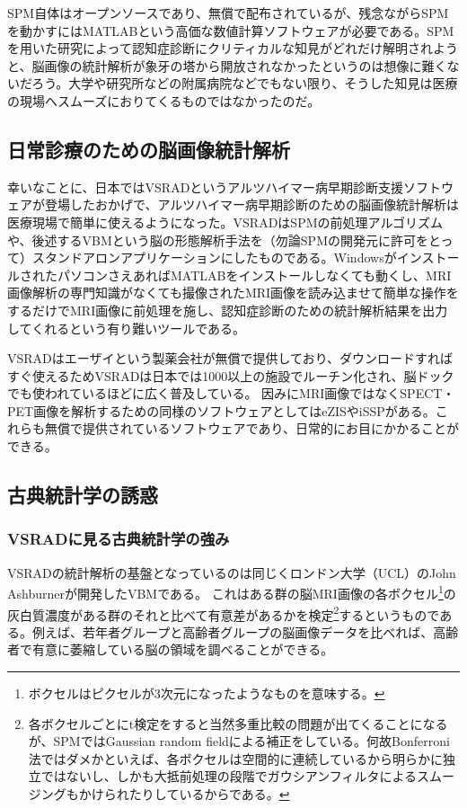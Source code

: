SPM自体はオープンソースであり、無償で配布されているが、残念ながらSPMを動かすにはMATLABという高価な数値計算ソフトウェアが必要である。SPMを用いた研究によって認知症診断にクリティカルな知見がどれだけ解明されようと、脳画像の統計解析が象牙の塔から開放されなかったというのは想像に難くないだろう。大学や研究所などの附属病院などでもない限り、そうした知見は医療の現場へスムーズにおりてくるものではなかったのだ。
\subsection{日常診療のための脳画像統計解析}
幸いなことに、日本ではVSRADというアルツハイマー病早期診断支援ソフトウェアが登場したおかげで、アルツハイマー病早期診断のための脳画像統計解析は医療現場で簡単に使えるようになった。VSRADはSPMの前処理アルゴリズムや、後述するVBMという脳の形態解析手法を（勿論SPMの開発元に許可をとって）スタンドアロンアプリケーションにしたものである。WindowsがインストールされたパソコンさえあればMATLABをインストールしなくても動くし、MRI画像解析の専門知識がなくても撮像されたMRI画像を読み込ませて簡単な操作をするだけでMRI画像に前処理を施し、認知症診断のための統計解析結果を出力してくれるという有り難いツールである。

VSRADはエーザイという製薬会社が無償で提供しており、ダウンロードすればすぐ使えるためVSRADは日本では1000以上の施設でルーチン化され、脳ドックでも使われているほどに広く普及している。
因みにMRI画像ではなくSPECT・PET画像を解析するための同様のソフトウェアとしてはeZISやiSSPがある。これらも無償で提供されているソフトウェアであり、日常的にお目にかかることができる。

\subsection{古典統計学の誘惑}
\subsubsection{VSRADに見る古典統計学の強み}
VSRADの統計解析の基盤となっているのは同じくロンドン大学（UCL）のJohn Ashburnerが開発したVBMである。
これはある群の脳MRI画像の各ボクセル\footnote{ボクセルはピクセルが3次元になったようなものを意味する。}の灰白質濃度がある群のそれと比べて有意差があるかを検定\footnote{各ボクセルごとにt検定をすると当然多重比較の問題が出てくることになるが、SPMではGaussian random fieldによる補正をしている。何故Bonferroni法ではダメかといえば、各ボクセルは空間的に連続しているから明らかに独立ではないし、しかも大抵前処理の段階でガウシアンフィルタによるスムージングもかけられたりしているからである。}するというものである。例えば、若年者グループと高齢者グループの脳画像データを比べれば、高齢者で有意に萎縮している脳の領域を調べることができる。

